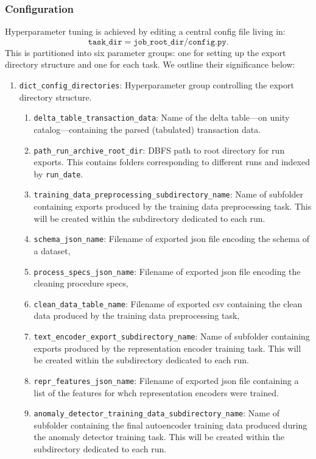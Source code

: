 \documentclass[a4paper, 10pt]{article}
\theoremstyle{plain}
\theoremstyle{definition}
\numberwithin{equation}{section}
\begin{document}
\subsubsection{Configuration}
Hyperparameter tuning is achieved by editing a central config file living in:
\begin{equation}\nonumber
    \texttt{task\_dir} = \texttt{job\_root\_dir}/\texttt{config.py}.
\end{equation}
This is partitioned into six parameter groups: one for setting up the export directory structure and one for each task. We outline their significance below:
\begin{enumerate}
    \item \texttt{dict\_config\_directories}: Hyperparameter group controlling the export directory structure.
          \begin{enumerate}
              \item \texttt{delta\_table\_transaction\_data}: Name of the delta table---on unity catalog---containing the parsed (tabulated) transaction data.
              \item \texttt{path\_run\_archive\_root\_dir}: DBFS path to root directory for run exports. This contains folders corresponding to different runs and indexed by \texttt{run\_date}.
              \item \texttt{training\_data\_preprocessing\_subdirectory\_name}: Name of subfolder containing exports produced by the training data preprocessing task. This will be created within the subdirectory dedicated to each run.
              \item \texttt{schema\_json\_name}: Filename of exported json file encoding the schema of a dataset,
              \item \texttt{process\_specs\_json\_name}: Filename of exported json file encoding the cleaning procedure specs,
              \item \texttt{clean\_data\_table\_name}: Filename of exported csv containing the clean data produced by the training data preprocessing task,
              \item \texttt{text\_encoder\_export\_subdirectory\_name}: Name of subfolder containing exports produced by the representation encoder training task. This will be created within the subdirectory dedicated to each run.
              \item \texttt{repr\_features\_json\_name}: Filename of exported json file containing a list of the features for whch representation encoders were trained.
              \item \texttt{anomaly\_detector\_training\_data\_subdirectory\_name}: Name of subfolder containing the final autoencoder training data produced during the anomaly detector training task. This will be created within the subdirectory dedicated to each run.

\end{enumerate}
\end{enumerate}
\end{document}
